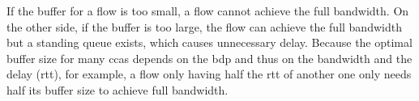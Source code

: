 \documentclass[conference]{IEEEtran}
\begin{document}

If the buffer for a flow is too small, a flow cannot achieve the full bandwidth. On the other side, if the buffer is too large, the flow can achieve the full bandwidth but a standing queue exists, which causes unnecessary delay.  
Because the optimal buffer size for many \glspl{cca} depends on the \gls{bdp} and thus on the bandwidth and the delay (\gls{rtt}), for example, a flow only having half the \gls{rtt} of another one only needs half its buffer size to achieve full bandwidth. 
\end{document}
